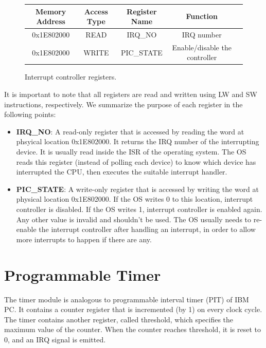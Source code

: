 \documentclass[oneside]{book}
\begin{document}
\begin{figure}[H]
\begin{center}
\begin{tabular}{|c|c|c|c|c|}

\hline \textbf{Memory Address} & \textbf{Access Type} &
       \textbf{Register Name} & \textbf{Function}  \\

\hline 0x1E802000 & READ & IRQ\_NO & IRQ number \\
\hline 0x1E802000 & WRITE & PIC\_STATE & Enable/disable the controller \\
\hline

\end{tabular}
\end{center}
\caption{Interrupt controller registers.}
\label{picregs}
\end{figure}

It is important to note that all registers are read and written using
LW and SW instructions, respectively. We summarize the purpose of each
register in the following points:

\begin{itemize}

\item \textbf{IRQ\_NO}:
A read-only register that is accessed by reading the word at phsyical
location 0x1E802000. It returns the IRQ number of the interrupting
device. It is usually read inside the ISR of the operating system. The OS
reads this register (instead of polling each device) to know which device
has interrupted the CPU, then executes the suitable interrupt handler.

\item \textbf{PIC\_STATE}:
A write-only register that is accessed by writing the word at physical
location 0x1E802000. If the OS writes 0 to this location, interrupt controller
is disabled. If the OS writes 1, interrupt controller is enabled again.
Any other value is invalid and shouldn't be used. The OS usually needs
to re-enable the interrupt controller after handling an interrupt,
in order to allow more interrupts to happen if there are any.

\end{itemize}

\section{Programmable Timer}

The timer module is analogous to programmable interval timer (PIT) of IBM PC.
It contains a counter register that is incremented (by 1) on every clock
cycle. The timer contains another register, called threshold, which specifies
the maximum value of the counter. When the counter reaches threshold,
it is reset to 0, and an IRQ signal is emitted.\\
\end{document}
